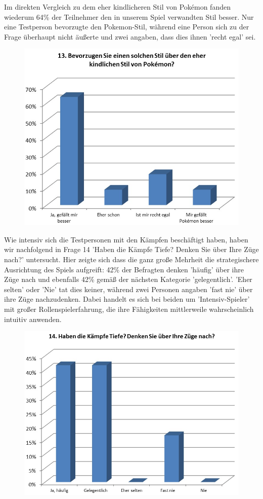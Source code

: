\documentclass[extern,palatino]{cgBA}
\begin{document}
Im direkten Vergleich zu dem eher kindlicheren Stil von Pokémon fanden wiederum 64\% der Teilnehmer den in unserem Spiel verwandten Stil besser. Nur eine Testperson bevorzugte den Pokemon-Stil, während eine Person sich zu der Frage überhaupt nicht äußerte und zwei angaben, dass dies ihnen 'recht egal' sei. 
\begin{figure}[H]
	\centering
	\includegraphics[width=1\textwidth]{table11.jpg}
\end{figure}
Wie intensiv sich die Testpersonen mit den Kämpfen beschäftigt haben, haben wir nachfolgend in Frage 14 'Haben die Kämpfe Tiefe? Denken Sie über Ihre Züge nach?' untersucht. Hier zeigte sich dass die ganz große Mehrheit die strategischere Ausrichtung des Spiels aufgreift: 42\% der Befragten denken 'häufig' über ihre Züge nach und ebenfalls 42\% gemäß der nächsten Kategorie 'gelegentlich'. 'Eher selten' oder 'Nie' tat dies keiner, während zwei Personen angaben 'fast nie' über ihre Züge nachzudenken. Dabei handelt es sich bei beiden um 'Intensiv-Spieler' mit großer Rollenspielerfahrung, die ihre Fähigkeiten mittlerweile wahrscheinlich intuitiv anwenden. 
\begin{figure}[H]
	\centering
	\includegraphics[width=1\textwidth]{table12.jpg}
\end{figure}
\end{document}
